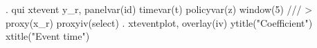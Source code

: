 . qui xtevent y_r, panelvar(id) timevar(t) policyvar(z) window(5) ///
>         proxy(x_r) proxyiv(select)
{\smallskip}
. xteventplot, overlay(iv) ytitle("Coefficient") xtitle("Event time")
